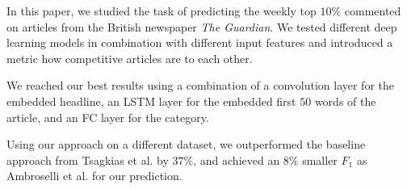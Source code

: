 In this paper, we studied the task of predicting the weekly top $10\%$ commented on articles from the British newspaper \textit{The Guardian}. We tested different deep learning models in combination with different input features and introduced a metric how competitive articles are to each other.

We reached our best results using a combination of a convolution layer for the embedded headline, an LSTM layer for the embedded first $50$ words of the article, and an FC layer for the category.

Using our approach on a different dataset, we outperformed the baseline approach from Tsagkias et al. by $37\%$, and achieved an $8\%$ smaller $F_1$ as Ambroselli et al. for our prediction.